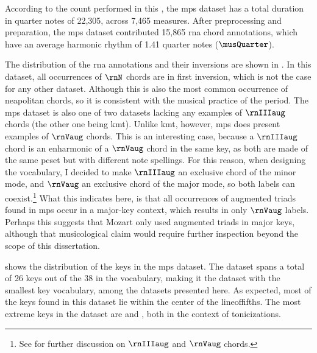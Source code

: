 
According to the count performed in this \thesisdiss{}, the
\gls{mps} dataset has a total duration in quarter notes of
22,305, across 7,465 measures. After preprocessing and
preparation, the \gls{mps} dataset contributed 15,865
\gls{rna} chord annotations, which have an average harmonic
rhythm of 1.41 quarter notes ($\musQuarter$).

The distribution of the \gls{rna} annotations and their
inversions are shown in . In this
dataset, all occurrences of $\rnN$ chords are in first
inversion, which is not the case for any other dataset.
Although this is also the most common occurrence of
\gls{neapolitan} chords, so it is consistent with the
musical practice of the period. The \gls{mps} dataset is
also one of two datasets lacking any examples of $\rnIIIaug$
chords (the other one being \gls{kmt}). Unlike \gls{kmt},
however, \gls{mps} does present examples of $\rnVaug$
chords. This is an interesting case, because a $\rnIIIaug$
chord is an enharmonic of a $\rnVaug$ chord in the same key,
as both are made of the same \gls{pcset} but with different
note spellings. For this reason, when designing the
vocabulary, I decided to make $\rnIIIaug$ an exclusive chord
of the minor mode, and $\rnVaug$ an exclusive chord of the
major mode, so both labels can coexist.\footnote{See
 for
further discussion on $\rnIIIaug$ and $\rnVaug$ chords.}
What this indicates here, is that all occurrences of
augmented triads found in \gls{mps} occur in a major-key
context, which results in only $\rnVaug$ labels. Perhaps
this suggests that Mozart only used augmented triads in
major keys, although that musicological claim would require
further inspection beyond the scope of this dissertation.



 shows the distribution of the keys
in the \gls{mps} dataset. The dataset spans a total of 26
keys out of the 38 in the vocabulary, making it the dataset
with the smallest key vocabulary, among the datasets
presented here. As expected, most of the keys found in this
dataset lie within the center of the \gls{lineoffifths}. The
most extreme keys in the dataset are \keydb{} and \keyFs{},
both in the context of tonicizations.
